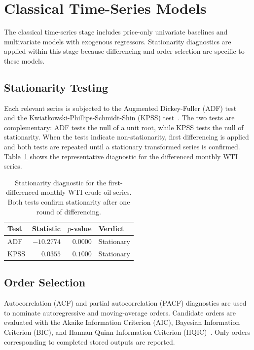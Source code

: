 \documentclass[12pt,a4paper]{article}
\begin{document}
\section{Classical Time-Series Models}\label{sec:classical}

The classical time-series stage includes price-only univariate baselines and multivariate models with exogenous regressors. Stationarity diagnostics are applied within this stage because differencing and order selection are specific to these models.

\subsection{Stationarity Testing}

Each relevant series is subjected to the Augmented Dickey-Fuller (ADF) test~\citep{dickey1979distribution} and the Kwiatkowski-Phillips-Schmidt-Shin (KPSS) test~\citep{kwiatkowski1992testing}. The two tests are complementary: ADF tests the null of a unit root, while KPSS tests the null of stationarity. When the tests indicate non-stationarity, first differencing is applied and both tests are repeated until a stationary transformed series is confirmed. Table~\ref{tab:stationarity} shows the representative diagnostic for the differenced monthly WTI series.

\begin{table}[H]
\centering
\caption{Stationarity diagnostic for the first-differenced monthly WTI crude oil series. Both tests confirm stationarity after one round of differencing.}\label{tab:stationarity}
\small
\begin{tabular}{@{}lrrl@{}}
\toprule
\textbf{Test} & \textbf{Statistic} & \textbf{$p$-value} & \textbf{Verdict}\\
\midrule
ADF  & $-10.2774$ & $0.0000$ & Stationary \\
KPSS & $0.0355$   & $0.1000$ & Stationary \\
\bottomrule
\end{tabular}
\end{table}

\subsection{Order Selection}

Autocorrelation (ACF) and partial autocorrelation (PACF) diagnostics are used to nominate autoregressive and moving-average orders. Candidate orders are evaluated with the Akaike Information Criterion (AIC), Bayesian Information Criterion (BIC), and Hannan-Quinn Information Criterion (HQIC)~\citep{akaike1974new}. Only orders corresponding to completed stored outputs are reported.
\end{document}
